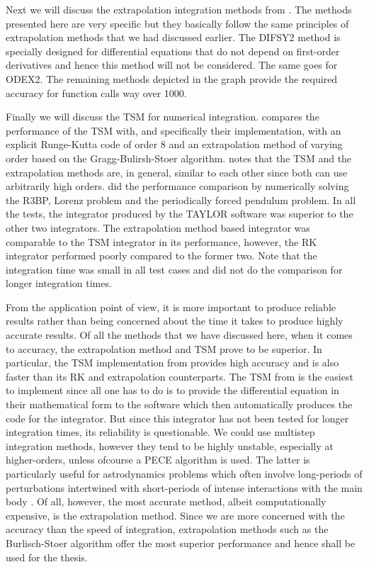 Next we will discuss the extrapolation integration methods from . The methods presented here are very specific but they basically follow the same principles of extrapolation methods that we had discussed earlier. The DIFSY2 method is specially designed for differential equations that do not depend on first-order derivatives and hence this method will not be considered. The same goes for ODEX2. The remaining methods depicted in the graph provide the required accuracy for function calls way over 1000.

Finally we will discuss the \gls{TSM} for numerical integration. \cite{taylorSoftware} compares the performance of the \gls{TSM} with, and specifically their implementation, with an explicit Runge-Kutta code of order 8 and an extrapolation method of varying order based on the Gragg-Bulirsh-Stoer algorithm. \cite{taylorSoftware} notes that the \gls{TSM} and the extrapolation methods are, in general, similar to each other since both can use arbitrarily high orders. \cite{taylorSoftware} did the performance comparison by numerically solving the \gls{R3BP}, Lorenz problem and the periodically forced pendulum problem. In all the tests, the integrator produced by the TAYLOR software was superior to the other two integrators. The extrapolation method based integrator was comparable to the \gls{TSM} integrator in its performance, however, the \gls{RK} integrator performed poorly compared to the former two. Note that the integration time was small in all test cases and \cite{taylorSoftware} did not do the comparison for longer integration times.

From the application point of view, it is more important to produce reliable results rather than being concerned about the time it takes to produce highly accurate results. Of all the methods that we have discussed here, when it comes to accuracy, the extrapolation method and \gls{TSM} prove to be superior. In particular, the \gls{TSM} implementation from \cite{taylorSoftware} provides high accuracy and is also faster than its \gls{RK} and extrapolation counterparts. The \gls{TSM} from \cite{taylorSoftware} is the easiest to implement since all one has to do is to provide the differential equation in their mathematical form to the software which then automatically produces the code for the integrator. But since this integrator has not been tested for longer integration times, its reliability is questionable. We could use multistep integration methods, however they tend to be highly unstable, especially at higher-orders, unless ofcourse a \gls{PECE} algorithm is used. The latter is particularly useful for astrodynamics problems which often involve long-periods of perturbations intertwined with short-periods of intense interactions with the main body \cite{danbook}. Of all, however, the most accurate method, albeit computationally expensive, is the extrapolation method. Since we are more concerned with the accuracy than the speed of integration, extrapolation methods such as the Burlisch-Stoer algorithm offer the most superior performance and hence shall be used for the thesis.
